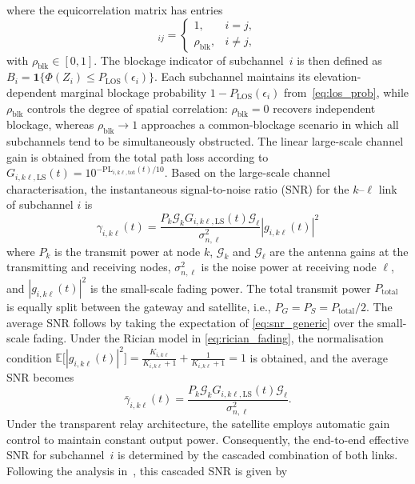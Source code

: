 \documentclass[journal]{IEEEtran}
\begin{document}
where the equicorrelation matrix has entries
\begin{equation}
[\mathbf{R}_{\mathrm{blk}}]_{ij} = \begin{cases}
1, & i = j, \\
\rho_{\mathrm{blk}}, & i \neq j,
\end{cases}
\label{eq:corr_matrix_blk}
\end{equation}
with $\rho_{\mathrm{blk}} \in [0,1]$. The blockage indicator of
subchannel~$i$ is then defined as
$B_i = \mathbf{1}\{\Phi(Z_i) \leq P_{\mathrm{LOS}}(\epsilon_i)\}$.
Each subchannel maintains its elevation-dependent marginal
blockage probability
$1 - P_{\mathrm{LOS}}(\epsilon_i)$ from~\eqref{eq:los_prob}, while
$\rho_{\mathrm{blk}}$ controls the degree of spatial correlation:
$\rho_{\mathrm{blk}} = 0$ recovers independent blockage, whereas
$\rho_{\mathrm{blk}} \to 1$ approaches a common-blockage scenario in
which all subchannels tend to be simultaneously obstructed.
The linear large-scale channel gain is obtained from the total path loss according to
$G_{i,k\ell,\mathrm{LS}}(t) = 10^{-\mathrm{PL}_{i,k\ell,\mathrm{tot}}(t)/10}.
$ Based on the large-scale channel characterisation, the instantaneous signal-to-noise ratio (SNR) for the $k$--$\ell$ link of subchannel $i$ is
\begin{equation}
\gamma_{i,k\ell}(t)
= \frac{P_k \mathcal{G}_k G_{i,k\ell,\mathrm{LS}}(t) \mathcal{G}_\ell}
{\sigma_{n,\ell}^2}
|g_{i,k\ell}(t)|^2
\label{eq:snr_generic}
\end{equation}
where $P_k$ is the transmit power at node $k$, $\mathcal{G}_k$ and $\mathcal{G}_\ell$ are the antenna gains at the transmitting and receiving nodes, $\sigma_{n,\ell}^2$ is the noise power at receiving node $\ell$, and $|g_{i,k\ell}(t)|^2$ is the small-scale fading power. The total transmit power $P_{\mathrm{total}}$ is equally split between the gateway and satellite, i.e., $P_G = P_S = P_{\mathrm{total}}/2$. The average SNR follows by taking the expectation of \eqref{eq:snr_generic} over the small-scale fading. Under the Rician model in \eqref{eq:rician_fading}, the normalisation condition $
\mathbb{E}\bigl[|g_{i,k\ell}(t)|^2\bigr] 
= \frac{K_{i,k\ell}}{K_{i,k\ell}+1} + \frac{1}{K_{i,k\ell}+1} = 1
$ is obtained, and the average SNR becomes
\begin{equation}
\bar{\gamma}_{i,k\ell}(t)
= \frac{P_k \mathcal{G}_k G_{i,k\ell,\mathrm{LS}}(t) \mathcal{G}_\ell}
{\sigma_{n,\ell}^2}.
\label{eq:avg_snr_generic}
\end{equation} Under the transparent relay architecture, the satellite employs automatic gain control to maintain constant output power. Consequently, the end-to-end effective SNR for subchannel~$i$ is determined by the cascaded combination of both links. Following the analysis in~\cite{Hasna2003}, this cascaded SNR is given by
\end{document}
